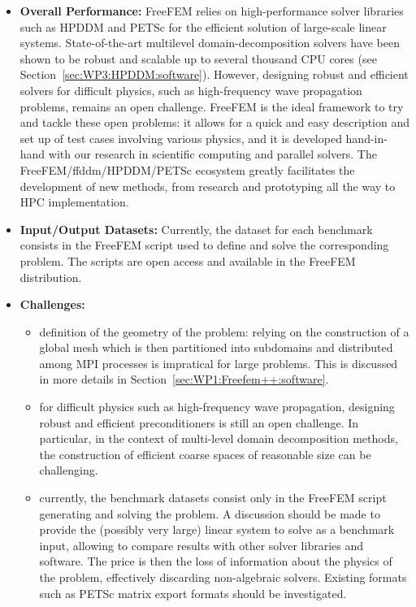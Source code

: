 \begin{itemize}
    \item \textbf{Overall Performance:} FreeFEM relies on high-performance solver libraries such as HPDDM and PETSc for the efficient solution of large-scale linear systems. State-of-the-art multilevel domain-decomposition solvers have been shown to be robust and scalable up to several thousand CPU cores (see Section~\cref{sec:WP3:HPDDM:software}). However, designing robust and efficient solvers for difficult physics, such as high-frequency wave propagation problems, remains an open challenge. FreeFEM is the ideal framework to try and tackle these open problems: it allows for a quick and easy description and set up of test cases involving various physics, and it is developed hand-in-hand with our research in scientific computing and parallel solvers. The FreeFEM/ffddm/HPDDM/PETSc ecosystem greatly facilitates the development of new methods, from research and prototyping all the way to HPC implementation.
    \item \textbf{Input/Output Datasets:} Currently, the dataset for each benchmark consists in the FreeFEM script used to define and solve the corresponding problem. The scripts are open access and available in the FreeFEM distribution.
    \item \textbf{Challenges:}
        \begin{itemize}
        \item definition of the geometry of the problem: relying on the construction of a global mesh which is then partitioned into subdomains and distributed among MPI processes is impratical for large problems. This is discussed in more details in Section~\cref{sec:WP1:Freefem++:software}.
        \item for difficult physics such as high-frequency wave propagation, designing robust and efficient preconditioners is still an open challenge. In particular, in the context of multi-level domain decomposition methods, the construction of efficient coarse spaces of reasonable size can be challenging.
        \item currently, the benchmark datasets consist only in the FreeFEM script generating and solving the problem. A discussion should be made to provide the (possibly very large) linear system to solve as a benchmark input, allowing to compare results with other solver libraries and software. The price is then the loss of information about the physics of the problem, effectively discarding non-algebraic solvers. Existing formats such as PETSc matrix export formats should be investigated.

\end{itemize}
\end{itemize}
